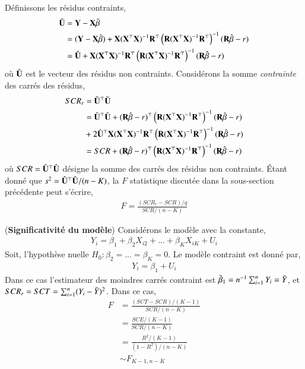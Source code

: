 \documentclass[10pt, reqno]{amsart}
\begin{document}
Définissons les résidus contraints,
\begin{align*}
\tilde{\mathbf U}&=\mathbf Y-\mathbf X\tilde{\beta}\\
&=(\mathbf Y-\mathbf X\hat{\beta}) + \mathbf X(\mathbf X^\top\mathbf X)^{-1}\mathbf{R}^\top\left(\mathbf{R}(\mathbf X^\top\mathbf X)^{-1}\mathbf{R}^\top\right)^{-1}(\mathbf{R}\hat{\beta}-r)\\
&=\hat{\mathbf U} + \mathbf X(\mathbf X^\top\mathbf X)^{-1}\mathbf{R}^\top\left(\mathbf{R}(\mathbf X^\top\mathbf X)^{-1}\mathbf{R}^\top\right)^{-1}(\mathbf{R}\hat{\beta}-r)
\end{align*}
où $\hat{\mathbf U}$ est le vecteur des résidus non contraints. Considérons la somme \emph{contrainte} des carrés des résidus,
\begin{align*}
SCR_r &= \tilde{\mathbf U}^\top\tilde{\mathbf U}\\
&= \hat{\mathbf U}^\top\hat{\mathbf U} + (\mathbf{R}\hat{\beta} - r)^\top
\left(\mathbf{R}(\mathbf X^\top \mathbf X)^{-1}\mathbf{R}^\top\right)^{-1}(\mathbf{R}\hat{\beta} - r)\\
&+ 2\hat{\mathbf U}^\top\mathbf X(\mathbf X^\top\mathbf X)^{-1}\mathbf{R}^\top\left(\mathbf{R}(\mathbf X^\top\mathbf X)^{-1}\mathbf{R}^\top\right)^{-1}(\mathbf{R}\hat{\beta}-r)\\
&=SCR + (\mathbf{R}\hat{\beta}-r)^\top\left(\mathbf{R}(\mathbf X^\top\mathbf X)^{-1}\mathbf{R}^\top\right)^{-1}  (\mathbf{R}\hat{\beta}-r)
\end{align*}
où $SCR = \hat{\mathbf U}^\top\hat{\mathbf U}$ désigne la somme des carrés des résidus non contraints. \'Etant donné que $s^2 = \hat{\mathbf U}^\top\hat{\mathbf U}/(n-K)$, la $F$ statistique discutée dans la sous-section précédente peut s'écrire,
\begin{align}
F = \frac{(SCR_r -SCR)/q}{SCR/(n-K)}
\label{eq46}
\end{align}
\begin{exemple}
(\textbf{Significativité du modèle}) Considérons le modèle avec la constante,
\begin{align*}
Y_i = \beta_1 + \beta_2X_{i2} + ...+\beta_KX_{iK} + U_i
\end{align*}
Soit, l'hypothèse nuelle $H_0: \beta_2 = ...=\beta_K =0$. Le modèle contraint est donné par,
\begin{align*}
Y_i = \beta_1 + U_i
\end{align*}
Dans ce cas l'estimateur des moindres carrés contraint est $\tilde{\beta}_1 =n^{-1}\sum_{i=1}^n Y_i = \bar{Y}$, et $SCR_r =SCT =\sum_{i=1}^n (Y_i-\bar{Y})^2$. Dans ce cas,
\begin{align*}
F &=\frac{(SCT -SCR)/(K-1)}{SCR/(n-K)}\\
&=\frac{SCE/(K-1)}{SCR/(n-K)}\\
&= \frac{R^2/(K-1)}{(1-R^2)/(n-K)}\\
&\sim F_{K-1, n-K}
\end{align*}
\label{ex1}
\end{exemple}
\end{document}
